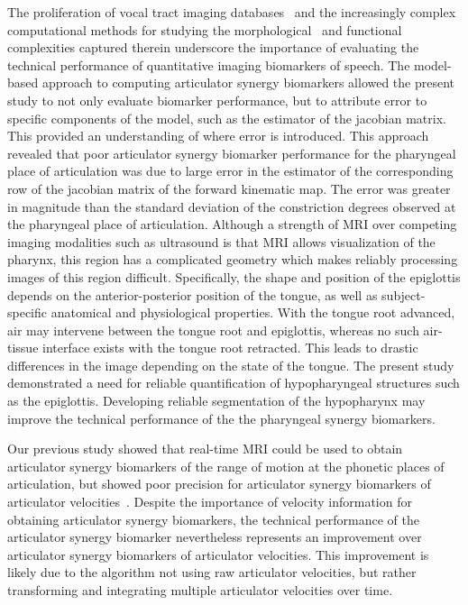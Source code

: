 \documentclass[preprint]{JASAnew}
\begin{document}
The proliferation of vocal tract imaging databases~\citep{narayanan2014real,sorensen2017database} and the increasingly complex computational methods for studying the morphological~\citep{lammert2013morphological} and functional~\citep{dawson2016methods} complexities captured therein underscore the importance of evaluating the technical performance of quantitative imaging biomarkers of speech. The model-based approach to computing articulator synergy biomarkers allowed the present study to not only evaluate biomarker performance, but to attribute error to specific components of the model, such as the estimator of the jacobian matrix. This provided an understanding of where error is introduced. This approach revealed that poor articulator synergy biomarker performance for the pharyngeal place of articulation was due to large error in the estimator of the corresponding row of the jacobian matrix of the forward kinematic map. The error was greater in magnitude than the standard deviation of the constriction degrees observed at the pharyngeal place of articulation. Although a strength of MRI over competing imaging modalities such as ultrasound is that MRI allows visualization of the pharynx, this region has a complicated geometry which makes reliably processing images of this region difficult. Specifically, the shape and position of the epiglottis depends on the anterior-posterior position of the tongue, as well as subject-specific anatomical and physiological properties. With the tongue root advanced, air may intervene between the tongue root and epiglottis, whereas no such air-tissue interface exists with the tongue root retracted. This leads to drastic differences in the image depending on the state of the tongue. The present study demonstrated a need for reliable quantification of hypopharyngeal structures such as the epiglottis. Developing reliable segmentation of the hypopharynx may improve the technical performance of the the pharyngeal synergy biomarkers.

Our previous study showed that real-time MRI could be used to obtain articulator synergy biomarkers of the range of motion at the phonetic places of articulation, but showed poor precision for articulator synergy biomarkers of articulator velocities~\citep{toger2017test}. Despite the importance of velocity information for obtaining articulator synergy biomarkers, the technical performance of the articulator synergy biomarker nevertheless represents an improvement over articulator synergy biomarkers of articulator velocities. This improvement is likely due to the algorithm not using raw articulator velocities, but rather transforming and integrating multiple articulator velocities over time. 
\end{document}
